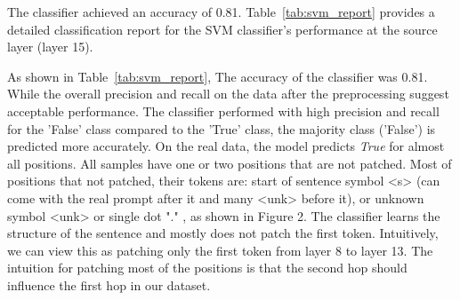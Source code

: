 \documentclass[11pt]{article}
\begin{document}
The classifier achieved an accuracy of 0.81. Table~\ref{tab:svm_report} provides a detailed classification report for the SVM classifier's performance at the source layer (layer 15).

\begin{table}[h!]
    \centering
    \caption{Classification Report for the classifier}
    \label{tab:svm_report}
\end{table}

As shown in Table~\ref{tab:svm_report}, The accuracy of the classifier was 0.81. While the overall precision and recall on the data after the preprocessing suggest acceptable performance. The classifier performed with high precision and recall for the 'False' class compared to the 'True' class, the majority class ('False') is predicted more accurately. On the real data, the model predicts \textit{True} for almost all positions. All samples have one or two positions that are not patched. Most of positions that not patched, their tokens are: start of sentence symbol <s> (can come with the real prompt after it and many <unk> before it), or unknown symbol <unk> or single dot "." , as shown in Figure 2. The classifier learns the structure of the sentence and mostly does not patch the first token. Intuitively, we can view this as patching only the first token from layer 8 to layer 13. The intuition for patching most of the positions is that the second hop should influence the first hop in our dataset.
\end{document}
